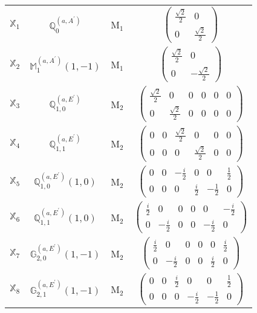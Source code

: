 \documentclass[fleqn,10pt,landscape]{article}
\begin{document}
\begin{itemize}
\begin{center}
\begin{longtable}{c|c|c|c}
$ \mathbb{X}_{1} $ & $\mathbb{Q}_{0}^{(a,A^{\prime})}$ & M$_{1}$ & $\begin{pmatrix} \frac{\sqrt{2}}{2} & 0 \\ 0 & \frac{\sqrt{2}}{2} \end{pmatrix}$ \\
$ \mathbb{X}_{2} $ & $\mathbb{M}_{1}^{(a,A^{\prime})}(1,-1)$ & M$_{1}$ & $\begin{pmatrix} \frac{\sqrt{2}}{2} & 0 \\ 0 & - \frac{\sqrt{2}}{2} \end{pmatrix}$ \\ \hline
$ \mathbb{X}_{3} $ & $\mathbb{Q}_{1,0}^{(a,E^{\prime})}$ & M$_{2}$ & $\begin{pmatrix} \frac{\sqrt{2}}{2} & 0 & 0 & 0 & 0 & 0 \\ 0 & \frac{\sqrt{2}}{2} & 0 & 0 & 0 & 0 \end{pmatrix}$ \\
$ \mathbb{X}_{4} $ & $\mathbb{Q}_{1,1}^{(a,E^{\prime})}$ & M$_{2}$ & $\begin{pmatrix} 0 & 0 & \frac{\sqrt{2}}{2} & 0 & 0 & 0 \\ 0 & 0 & 0 & \frac{\sqrt{2}}{2} & 0 & 0 \end{pmatrix}$ \\
$ \mathbb{X}_{5} $ & $\mathbb{Q}_{1,0}^{(a,E^{\prime})}(1,0)$ & M$_{2}$ & $\begin{pmatrix} 0 & 0 & - \frac{i}{2} & 0 & 0 & \frac{1}{2} \\ 0 & 0 & 0 & \frac{i}{2} & - \frac{1}{2} & 0 \end{pmatrix}$ \\
$ \mathbb{X}_{6} $ & $\mathbb{Q}_{1,1}^{(a,E^{\prime})}(1,0)$ & M$_{2}$ & $\begin{pmatrix} \frac{i}{2} & 0 & 0 & 0 & 0 & - \frac{i}{2} \\ 0 & - \frac{i}{2} & 0 & 0 & - \frac{i}{2} & 0 \end{pmatrix}$ \\
$ \mathbb{X}_{7} $ & $\mathbb{G}_{2,0}^{(a,E^{\prime})}(1,-1)$ & M$_{2}$ & $\begin{pmatrix} \frac{i}{2} & 0 & 0 & 0 & 0 & \frac{i}{2} \\ 0 & - \frac{i}{2} & 0 & 0 & \frac{i}{2} & 0 \end{pmatrix}$ \\
$ \mathbb{X}_{8} $ & $\mathbb{G}_{2,1}^{(a,E^{\prime})}(1,-1)$ & M$_{2}$ & $\begin{pmatrix} 0 & 0 & \frac{i}{2} & 0 & 0 & \frac{1}{2} \\ 0 & 0 & 0 & - \frac{i}{2} & - \frac{1}{2} & 0 \end{pmatrix}$ \\ \hline

\end{longtable}
\end{center}
\end{itemize}
\end{document}
